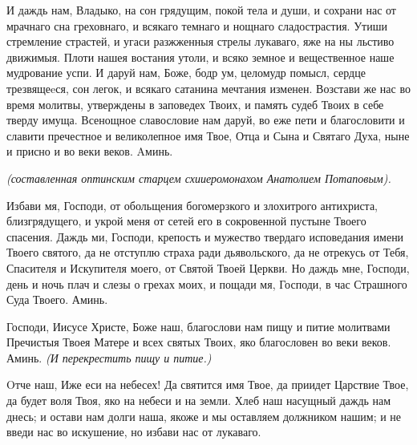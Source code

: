 \mychapterending




И даждь нам, Владыко, на сон грядущим, покой тела и души, и сохрани нас от мрачнаго сна греховнаго, и всякаго темнаго и нощнаго сладострастия. Утиши стремление страстей, и угаси разжженныя стрелы лукаваго, яже на ны льстиво движимыя. Плоти нашея востания утоли, и всяко земное и вещественное наше мудрование успи. И даруй нам, Боже, бодр ум, целомудр помысл, сердце трезвящеeся, сон легок, и всякаго сатанина мечтания изменен. Возстави же нас во время молитвы, утверждены в заповедех Твоих, и память судеб Твоих в себе тверду имуща. Всенощное славословие нам даруй, во еже пети и благословити и славити пречестное и великолепное имя Твое, Отца и Сына и Святаго Духа, ныне и присно и во веки веков. Aминь.





\mychapterending




\itshape (составленная оптинским старцем схииеромонахом Анатолием Потаповым).\normalfont{}


Избави мя, Господи, от обольщения богомерзкого и злохитрого антихриста, близгрядущего, и укрой меня от сетей его в сокровенной пустыне Твоего спасения. Даждь ми, Господи, крепость и мужество твердаго исповедания имени Твоего святого, да не отступлю страха ради дьявольского, да не отрекусь от Тебя, Спасителя и Искупителя моего, от Святой Твоей Церкви. Но даждь мне, Господи, день и ночь плач и слезы о грехах моих, и пощади мя, Господи, в час Страшного Суда Твоего. Аминь.


\mychapterending





Господи, Иисусе Христе, Боже наш, благослови нам пищу и питие молитвами Пречистыя Твоея Матере и всех святых Твоих, яко благословен во веки веков. Аминь. \itshape (И перекрестить пищу и питие.)\normalfont{}






\mychapterending




Oтче наш, Иже еси на небесех! Да святится имя Твое, да приидет Царствие Твое, да будет воля Твоя, яко на небеси и на земли. Хлеб наш насущный даждь нам днесь; и остави нам долги наша, якоже и мы оставляем должником нашим; и не введи нас во искушение, но избави нас от лукаваго.


